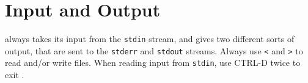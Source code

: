 % 
% 
% 
% 
% 
\section{Input and Output}
\bernina{} always takes its input from the {\tt stdin} stream, and gives
two different sorts of output, that are sent to the {\tt stderr} and
{\tt stdout} streams.
Always use {\tt <} and {\tt >} to read and/or write files.
When reading input from {\tt stdin}, use CTRL-D twice to exit \bernina.

